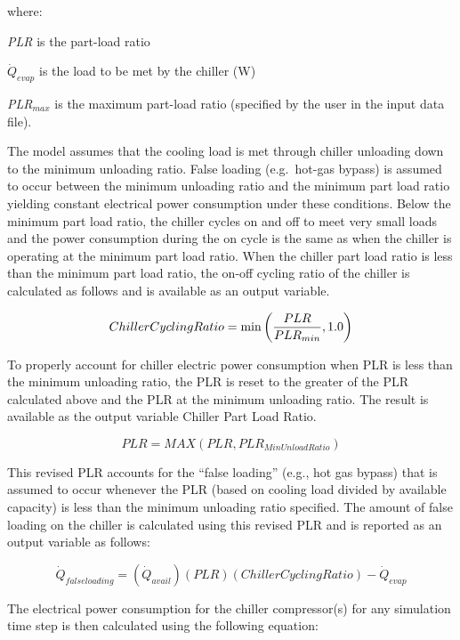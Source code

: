 where:

\emph{PLR} is the part-load ratio

\({\dot{Q}_{evap}}\) is the load to be met by the chiller (W)

\emph{PLR\(_{max}\)} is the maximum part-load ratio (specified by the user in the input data file).

The model assumes that the cooling load is met through chiller unloading down to the minimum unloading ratio. False loading (e.g.~hot-gas bypass) is assumed to occur between the minimum unloading ratio and the minimum part load ratio yielding constant electrical power consumption under these conditions. Below the minimum part load ratio, the chiller cycles on and off to meet very small loads and the power consumption during the on cycle is the same as when the chiller is operating at the minimum part load ratio. When the chiller part load ratio is less than the minimum part load ratio, the on-off cycling ratio of the chiller is calculated as follows and is available as an output variable.

\begin{equation}
  ChillerCyclingRatio = \min\left(\frac{PLR}{PLR_{min}},1.0\right)
\end{equation}

To properly account for chiller electric power consumption when PLR is less than the minimum unloading ratio, the PLR is reset to the greater of the PLR calculated above and the PLR at the minimum unloading ratio. The result is available as the output variable Chiller Part Load Ratio.

\begin{equation}
PLR = MAX(PLR,PL{R_{MinUnloadRatio}})
\end{equation}

This revised PLR accounts for the ``false loading'' (e.g., hot gas bypass) that is assumed to occur whenever the PLR (based on cooling load divided by available capacity) is less than the minimum unloading ratio specified. The amount of false loading on the chiller is calculated using this revised PLR and is reported as an output variable as follows:

\begin{equation}
{\dot{Q}_{falseloading}} = \left( {{\dot{Q}_{avail}}} \right)\left( {PLR} \right)\left( {ChillerCyclingRatio} \right) - {\dot{Q}_{evap}}
\end{equation}

The electrical power consumption for the chiller compressor(s) for any simulation time step is then calculated using the following equation:

